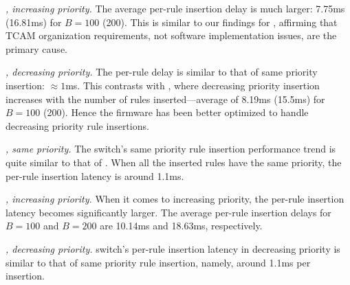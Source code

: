 \emph{\BroadcomThree, increasing priority.} 
The average per-rule insertion delay is much 
larger: 7.75ms (16.81ms) for $B = 100$ (200). This is similar to our findings
for \BroadcomOne, affirming that TCAM organization requirements, not software
implementation issues, are the primary cause.



\emph{\BroadcomThree, decreasing priority.} 
The per-rule delay is similar to that of
same priority insertion: $\approx 1$ms. This contrasts with
\BroadcomOne, where decreasing priority insertion increases with the
number of rules inserted---average of 8.19ms (15.5ms) for $B=100$ (200). 
Hence the \BroadcomThree firmware has been better optimized to handle 
decreasing priority rule insertions.


\emph{\IBM, same priority.}
The \IBM switch's same priority rule insertion performance
trend is quite similar to that of \Broadcom. When all the inserted rules
have the same priority, the per-rule insertion latency is around 1.1ms.

\emph{\IBM,  increasing priority.}
When it comes to increasing priority, the per-rule insertion latency becomes significantly larger.
The average per-rule insertion delays for $B=100$ and $B=200$ are 10.14ms and 18.63ms, respectively. 

\emph{\IBM,  decreasing priority.}
\IBM switch's per-rule insertion latency in decreasing priority is similar to that of same priority
rule insertion, namely, around 1.1ms per insertion.

